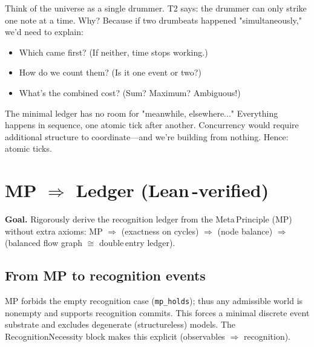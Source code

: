 \documentclass[11pt]{article}
\begin{document}
\begin{intuitionbox}
Think of the universe as a single drummer. T2 says: the drummer can only strike one note at a time. Why? Because if two drumbeats happened "simultaneously," we'd need to explain:
\begin{itemize}
  \item Which came first? (If neither, time stops working.)
  \item How do we count them? (Is it one event or two?)
  \item What's the combined cost? (Sum? Maximum? Ambiguous!)
\end{itemize}

The minimal ledger has no room for "meanwhile, elsewhere..." Everything happens in sequence, one atomic tick after another. Concurrency would require additional structure to coordinate—and we're building from nothing. Hence: atomic ticks.
\end{intuitionbox}

\section*{MP $\Rightarrow$ Ledger (Lean\,-verified)}
\textbf{Goal.} Rigorously derive the recognition ledger from the Meta\,Principle (MP) without extra axioms: MP $\Rightarrow$ (exactness on cycles) $\Rightarrow$ (node balance) $\Rightarrow$ (balanced flow graph $\cong$ double\,entry ledger).

\subsection*{From MP to recognition events}
MP forbids the empty recognition case (\texttt{mp\_holds}); thus any admissible world is nonempty and supports recognition commits. This forces a minimal discrete event substrate and excludes degenerate (structureless) models. The RecognitionNecessity block makes this explicit (observables $\Rightarrow$ recognition).
\end{document}
